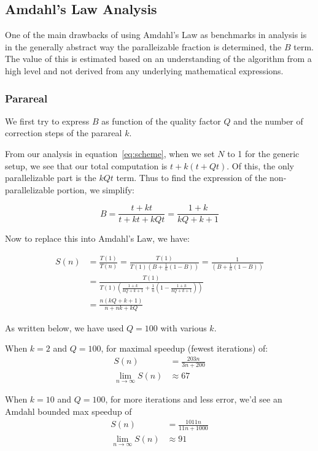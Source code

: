 \documentclass[letterpaper,12pt]{article}
\begin{document}
\subsection{Amdahl's Law Analysis}

One of the main drawbacks of using Amdahl's Law as benchmarks in analysis is in the generally abstract way the paralleizable fraction is determined, the $B$ term.  The value of this is estimated based on an understanding of the algorithm from a high level and not derived from any underlying mathematical expressions.

\subsubsection{Parareal}

We first try to express $B$ as function of the quality factor $Q$ and the number of correction steps of the parareal $k$.

From our analysis in equation~\ref{eq:scheme}, when we set $N$ to 1 for the generic setup, we see that our total computation is $t + k(t+ Qt)$.  Of this, the only parallelizable part is the $kQt$ term.  Thus to find the expression of the non-parallelizable portion, we simplify:

\[
B = \frac{t+kt}{t+kt+kQt} = \frac{1+k}{kQ+k+1}
\]

Now to replace this into Amdahl's Law, we have:

\[
\begin{aligned}
S(n) &= \frac{T(1)}{T(n)} = \frac{T(1)}{ T(1) \left( B + \frac{1}{n} (1-B) \right)} = \frac{1}{\left( B + \frac{1}{n} (1-B) \right)}\\
       &= \frac{T(1)}{T(1) \left( \frac{1+k}{kQ+k+1} + \frac{1}{n} (1- \frac{1+k}{kQ+k+1}) \right)} \\
       &= \frac{n(kQ+k+1)}{n+nk+kQ}
\end{aligned}
\]

As written below, we have used $Q = 100$ with various $k$.

When $k = 2$ and $Q = 100$, for maximal speedup (fewest iterations) of:
\[
\begin{aligned}
S(n) &= \frac{203n}{3n+200} \\
\lim_{n\to \infty}S(n) &\approx 67
\end{aligned}
\]

When $k = 10$ and $Q = 100$, for more iterations and less error, we'd see an Amdahl bounded max speedup of 
\[
\begin{aligned}
S(n) &= \frac{1011n}{11n+1000} \\
\lim_{n\to \infty}S(n) &\approx 91
\end{aligned}
\]
\end{document}
